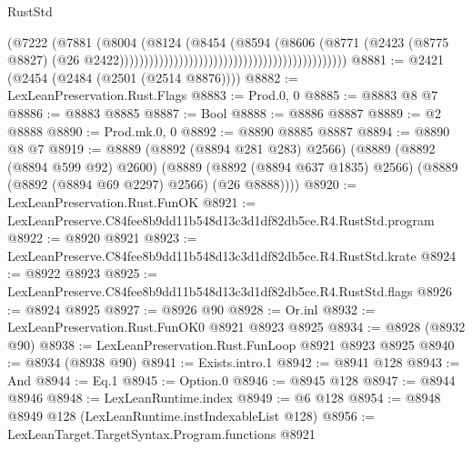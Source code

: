 \begin{lexlean}{RustStd}
\begin{coremodule}
                                                                            (@7222
                                                                              (@7881
                                                                                (@8004
                                                                                  (@8124
                                                                                    (@8454
                                                                                      (@8594
                                                                                        (@8606
                                                                                          (@8771
                                                                                            (@2423
                                                                                              (@8775
                                                                                                @8827)
                                                                                              (@26
                                                                                                @2422))))))))))))))))))))))))))))))))))))))))))))))
@8881 := @2421 (@2454 (@2484 (@2501 (@2514 @8876))))
@8882 := LexLeanPreservation.Rust.Flags
@8883 := Prod.{0, 0}
@8885 := @8883 @8 @7
@8886 := @8883 @8885
@8887 := Bool
@8888 := @8886 @8887
@8889 := @2 @8888
@8890 := Prod.mk.{0, 0}
@8892 := @8890 @8885 @8887
@8894 := @8890 @8 @7
@8919 := @8889
    (@8892 (@8894 @281 @283) @2566)
    (@8889
      (@8892 (@8894 @599 @92) @2600)
      (@8889 (@8892 (@8894 @637 @1835) @2566) (@8889 (@8892 (@8894 @69 @2297) @2566) (@26 @8888))))
@8920 := LexLeanPreservation.Rust.FunOK
@8921 := LexLeanPreserve.C84fee8b9dd11b548d13c3d1df82db5ce.R4.RustStd.program
@8922 := @8920 @8921
@8923 := LexLeanPreserve.C84fee8b9dd11b548d13c3d1df82db5ce.R4.RustStd.krate
@8924 := @8922 @8923
@8925 := LexLeanPreserve.C84fee8b9dd11b548d13c3d1df82db5ce.R4.RustStd.flags
@8926 := @8924 @8925
@8927 := @8926 @90
@8928 := Or.inl
@8932 := LexLeanPreservation.Rust.FunOK0 @8921 @8923 @8925
@8934 := @8928 (@8932 @90)
@8938 := LexLeanPreservation.Rust.FunLoop @8921 @8923 @8925
@8940 := @8934 (@8938 @90)
@8941 := Exists.intro.{1}
@8942 := @8941 @128
@8943 := And
@8944 := Eq.{1}
@8945 := Option.{0}
@8946 := @8945 @128
@8947 := @8944 @8946
@8948 := LexLeanRuntime.index
@8949 := @6 @128
@8954 := @8948 @8949 @128 (LexLeanRuntime.instIndexableList @128)
@8956 := LexLeanTarget.TargetSyntax.Program.functions @8921

\end{coremodule}
\end{lexlean}
